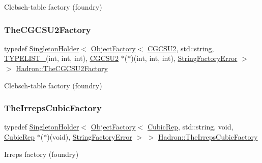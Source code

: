 Clebsch-\/table factory (foundry) 

\mbox{\label{namespaceHadron_a78329899af02f016ab89457f10d6e6ff}} 
\subsubsection{\texorpdfstring{TheCGCSU2Factory}{TheCGCSU2Factory}}
{\footnotesize\ttfamily typedef \mbox{\hyperlink{classUtil_1_1SingletonHolder}{Singleton\+Holder}}$<$ \mbox{\hyperlink{classUtil_1_1ObjectFactory}{Object\+Factory}}$<$ \mbox{\hyperlink{classHadron_1_1CGCSU2}{C\+G\+C\+S\+U2}}, std\+::string, \mbox{\hyperlink{adat__devel__install_2include_2adat_2typelist_8h_a0309f68a543c5c0994f9edc0e56dc59f}{T\+Y\+P\+E\+L\+I\+S\+T\+\_}}(int, int, int), \mbox{\hyperlink{classHadron_1_1CGCSU2}{C\+G\+C\+S\+U2}} $\ast$($\ast$)(int, int, int), \mbox{\hyperlink{structUtil_1_1StringFactoryError}{String\+Factory\+Error}} $>$ $>$ \mbox{\hyperlink{namespaceHadron_a78329899af02f016ab89457f10d6e6ff}{Hadron\+::\+The\+C\+G\+C\+S\+U2\+Factory}}}



Clebsch-\/table factory (foundry) 

\mbox{\label{namespaceHadron_a9b693812688b7b56d095964989de20b2}} 
\subsubsection{\texorpdfstring{TheIrrepsCubicFactory}{TheIrrepsCubicFactory}}
{\footnotesize\ttfamily typedef \mbox{\hyperlink{classUtil_1_1SingletonHolder}{Singleton\+Holder}}$<$ \mbox{\hyperlink{classUtil_1_1ObjectFactory}{Object\+Factory}}$<$ \mbox{\hyperlink{structHadron_1_1CubicRep}{Cubic\+Rep}}, std\+::string, void, \mbox{\hyperlink{structHadron_1_1CubicRep}{Cubic\+Rep}} $\ast$($\ast$)(void), \mbox{\hyperlink{structUtil_1_1StringFactoryError}{String\+Factory\+Error}} $>$ $>$ \mbox{\hyperlink{namespaceHadron_a9b693812688b7b56d095964989de20b2}{Hadron\+::\+The\+Irreps\+Cubic\+Factory}}}



Irreps factory (foundry) 

\mbox{\label{namespaceHadron_ae17c10048cdbba5312fcaa06692d632a}} 
